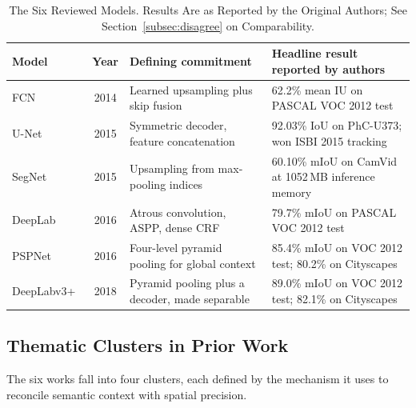 \documentclass[journal]{IEEEtran}
\begin{document}
\begin{table}[!t]
\renewcommand{\arraystretch}{1.3}
\caption{The Six Reviewed Models. Results Are as Reported by the Original Authors; See Section~\ref{subsec:disagree} on Comparability.}
\label{tab:models}
\centering
\begin{tabular}{|l|c|l|l|}
\hline
\textbf{Model} & \textbf{Year} & \textbf{Defining commitment} & \textbf{Headline result reported by authors}\\
\hline
FCN~\cite{long2014fully} & 2014 & Learned upsampling plus skip fusion & 62.2\% mean IU on PASCAL VOC 2012 test\\
\hline
U-Net~\cite{ronneberger2015unet} & 2015 & Symmetric decoder, feature concatenation & 92.03\% IoU on PhC-U373; won ISBI 2015 tracking\\
\hline
SegNet~\cite{badrinarayanan2015segnet} & 2015 & Upsampling from max-pooling indices & 60.10\% mIoU on CamVid at 1052\,MB inference memory\\
\hline
DeepLab~\cite{chen2016deeplab} & 2016 & Atrous convolution, ASPP, dense CRF & 79.7\% mIoU on PASCAL VOC 2012 test\\
\hline
PSPNet~\cite{zhao2016pspnet} & 2016 & Four-level pyramid pooling for global context & 85.4\% mIoU on VOC 2012 test; 80.2\% on Cityscapes\\
\hline
DeepLabv3+~\cite{chen2018encoderdecoder} & 2018 & Pyramid pooling plus a decoder, made separable & 89.0\% mIoU on VOC 2012 test; 82.1\% on Cityscapes\\
\hline
\end{tabular}
\end{table}

\subsection{Thematic Clusters in Prior Work}

The six works fall into four clusters, each defined by the mechanism it uses to
reconcile semantic context with spatial precision.
\end{document}
